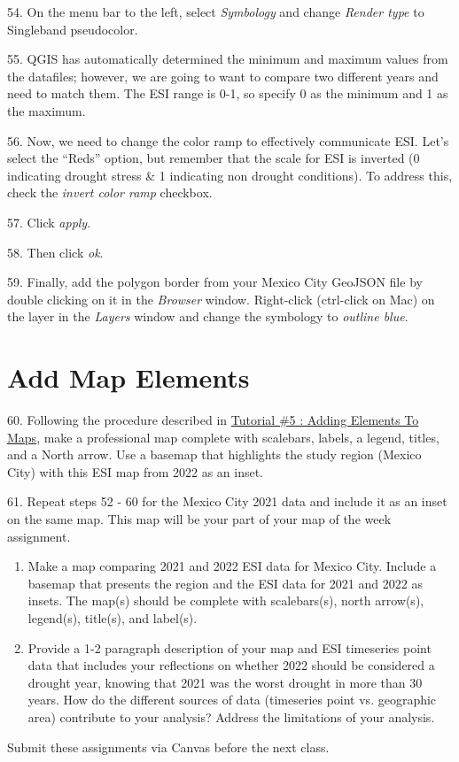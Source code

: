 \documentclass[oneside,a4paper,11pt,explicit]{book}
\begin{document}
54. On the menu bar to the left, select \textit{Symbology} and change \textit{Render type} to Singleband pseudocolor. 

55. QGIS has automatically determined the minimum and maximum values from the datafiles; however, we are going to want to compare two different years and need to match them. The ESI range is 0-1, so specify 0 as the minimum and 1 as the maximum. 

56. Now, we need to change the color ramp to effectively communicate ESI. Let's select the ``Reds'' option, but remember that the scale for ESI is inverted (0 indicating drought stress \& 1 indicating non drought conditions). To address this, check the \textit{invert color ramp} checkbox. 

57. Click \textit{apply}.

58. Then click \textit{ok}.

59. Finally, add the polygon border from your Mexico City GeoJSON file by double clicking on it in the \textit{Browser} window. Right-click (ctrl-click on Mac) on the layer in the \textit{Layers} window and change the symbology to \textit{outline blue}. 

\section{Add Map Elements}

60. Following the procedure described in \href{https://jeremydforsythe.github.io/icecream-tutorials/Tutorial5_AddingElementsToMaps/Tutorial5_AddingElementsToMaps.pdf}{Tutorial \#5 : Adding Elements To Maps}, make a professional map complete with scalebars, labels, a legend, titles, and a North arrow. Use a basemap that highlights the study region (Mexico City) with this ESI map from 2022 as an inset. 

61. Repeat steps 52 - 60 for the Mexico City 2021 data and include it as an inset on the same map. This map will be your part of your map of the week assignment.

\begin{tcolorbox}[colback=yellow!5!white,colframe=IceCreamOrbit,title= \vspace{.2em} \Large Map of the Week Assignments]
	\large
	\begin{enumerate}
		\item Make a map comparing 2021 and 2022 ESI data for Mexico City. Include a basemap that presents the region and the ESI data for 2021 and 2022 as insets. The map(s) should be complete with scalebars(s), north arrow(s), legend(s), title(s), and label(s).
        \item Provide a 1-2 paragraph description of your map and ESI timeseries point data that includes your reflections on whether 2022 should be considered a drought year, knowing that 2021 was the worst drought in more than 30 years. How do the different sources of data (timeseries point vs. geographic area) contribute to your analysis? Address the limitations of your analysis.
	\end{enumerate}
	Submit these assignments via Canvas before the next class.
\end{tcolorbox}
\end{document}
